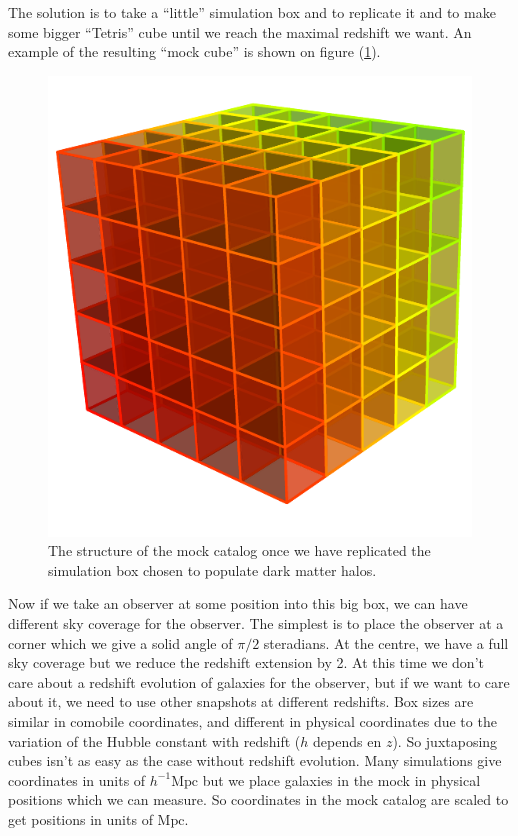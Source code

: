 The solution is to take a ``little'' simulation box and to replicate it and to
make some bigger ``Tetris'' cube until we reach the maximal redshift we want.
An example of the resulting ``mock cube'' is shown on figure
(\ref{fig:cubemock}).
%
\begin{figure}
    \centering
    \includegraphics[width=\linewidth]{figures/mock/mock}
    \caption{The structure of the mock catalog once we have replicated the
    simulation box chosen to populate dark matter halos.\label{fig:cubemock}}%
\end{figure}

Now if we take an observer at some position into this big box, we can have
different sky coverage for the observer. The simplest is to place the observer
at a corner which we give a solid angle of $\pi/2$ steradians. At the centre,
we have a full sky coverage but we reduce the redshift extension by 2.
%
At this time we don't care about a redshift evolution of galaxies for the
observer, but if we want to care about it, we need to use other snapshots at
different redshifts. Box sizes are similar in comobile coordinates, and
different in physical coordinates due to the variation of the Hubble constant
with redshift ($h$ depends en $z$). So juxtaposing cubes isn't as easy as the
case without redshift evolution.
%
Many simulations give coordinates in units of $h^{-1}\mathrm{Mpc}$ but we place
galaxies in the mock in physical positions which we can measure. So coordinates
in the mock catalog are scaled to get positions in units of $\mathrm{Mpc}$.

